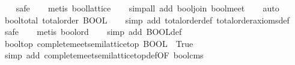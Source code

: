 \begin{isabellebody}
\ \ \isamarkupfalse%
\ safe\isanewline
\ \ \isamarkupfalse%
\ {}metis\ bool{}lattice{}\isanewline
\ \ \isamarkupfalse%
\ {}simp{}all\ add{}\ bool{}join\ bool{}meet{}\isanewline
\ \ \isamarkupfalse%
\ auto{}%
\endisatagproof
{\isafoldproof}%
%
\isadelimproof
\isanewline
%
\endisadelimproof
\isanewline
{}\isamarkupfalse%
\ bool{}total{}\ {}total{}order\ BOOL{}\isanewline
%
\isadelimproof
\ \ %
\endisadelimproof
%
\isatagproof
{}\isamarkupfalse%
\ {}simp\ add{}\ total{}order{}def\ total{}order{}axioms{}def{}\isanewline
\ \ \isamarkupfalse%
\ safe\isanewline
\ \ \isamarkupfalse%
\ {}metis\ bool{}ord{}\isanewline
\ \ \isamarkupfalse%
\ {}simp\ add{}\ BOOL{}def{}%
\endisatagproof
{\isafoldproof}%
%
\isadelimproof
\isanewline
%
\endisadelimproof
\isanewline
{}\isamarkupfalse%
\ bool{}top{}\ {}complete{}meet{}semilattice{}top\ BOOL\ {}\ True{}\isanewline
%
\isadelimproof
\ \ %
\endisadelimproof
%
\isatagproof
{}\isamarkupfalse%
\ {}simp\ add{}\ complete{}meet{}semilattice{}top{}def{}OF\ bool{}cms{}{}\isanewline

\end{isabellebody}

